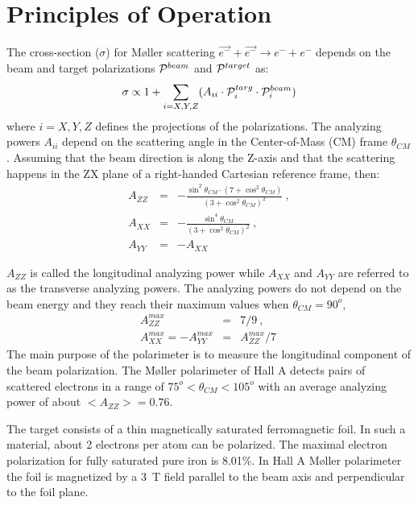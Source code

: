 {\section {Principles of Operation}
\label{sec:moller_principles}
\vspace{-\parskip}
The cross-section ($\sigma$) for M{\o}ller scattering 
$ \vec{e^-} + \vec{e^-} \rightarrow e^- + e^-$
depends on the beam and target polarizations ${\cal P}^{beam}$ and 
${\cal P}^{target}$ as:
$$         \sigma \propto 1 +  
            \sum_{i=X,Y,Z} (A_{ii}\cdot{}{\cal P}^{targ}_{i}\cdot{}{\cal P}^{beam}_{i}) $$
where $i = X,Y,Z$ defines the projections of the polarizations. 
The analyzing powers $A_{ii}$ depend on the scattering angle in the Center-of-Mass (CM) frame 
$\theta{}_{CM}$. 
Assuming that the beam direction is along the Z-axis and that the scattering
happens in the ZX plane of a right-handed Cartesian reference frame, then:
\begin{eqnarray*}
 A_{ZZ} &=&  -\frac{\sin^2\theta{}_{CM}\cdot(7+\cos^2\theta{}_{CM})}
                                   {(3+\cos^2\theta{}_{CM})^2}\ , \\
         A_{XX} &=& -\frac{\sin^4\theta{}_{CM}}
                       {(3 + \cos^2\theta{}_{CM})^2}\ , \\
         A_{YY} &=& -A_{XX}
\end{eqnarray*}

$A_{ZZ}$ is called the longitudinal analyzing power while $A_{XX}$ and $A_{YY}$ are referred to as the transverse analyzing powers.
The analyzing powers do not depend on the beam energy and they reach their maximum values when $\theta{}_{CM}=90^o$,
\begin{eqnarray*}
A_{ZZ}^{max} &=& 7/9\ ,\\
A_{XX}^{max} = - A_{YY}^{max} &=& A_{ZZ}^{max} / 7\ 
\end{eqnarray*}
The main purpose of the polarimeter is to measure the longitudinal component of the beam polarization.
The M{\o}ller polarimeter of Hall A detects pairs of scattered electrons in a 
range of $ 75^o < \theta{}_{CM} < 105^o$ with an average analyzing power 
of about $<A_{ZZ}>=0.76$.

The target consists of a thin magnetically saturated ferromagnetic foil.
In such a material, about 2 electrons per atom can be polarized.
The maximal electron polarization for fully saturated pure iron is 8.01\%.
In Hall A M{\o}ller polarimeter the foil is magnetized by a 3~T field parallel to the beam
axis and perpendicular to the foil plane.

}
